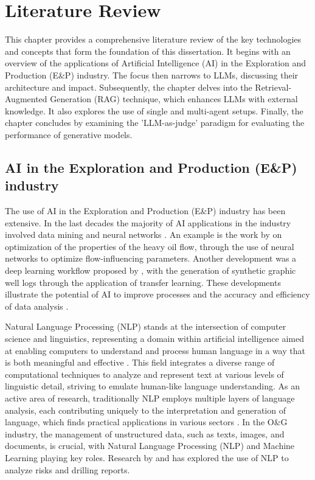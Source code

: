    
\chapter{Literature Review} 


    This chapter provides a comprehensive literature review of the key technologies and concepts that form the foundation of this dissertation. It begins with an overview of the applications of Artificial Intelligence (AI) in the Exploration and Production (E\&P) industry. The focus then narrows to LLMs, discussing their architecture and impact. Subsequently, the chapter delves into the Retrieval-Augmented Generation (RAG) technique, which enhances LLMs with external knowledge. It also explores the use of single and multi-agent setups. Finally, the chapter concludes by examining the 'LLM-as-judge' paradigm for evaluating the performance of generative models.


    \section{AI in the Exploration and Production (E\&P) industry}

        The use of AI in the Exploration and Production (E\&P) industry has been extensive. 
        In the last decades the majority of AI applications in the industry involved data mining and neural networks \citep{Bravo2014}. 
        An example is the work by \citep{Gudala2021} on optimization of the properties of the heavy oil flow, through the use of neural networks to optimize flow-influencing parameters.
        Another development was a deep learning workflow proposed by \citep{Gohari2024}, with the generation of synthetic graphic well logs through the application of transfer learning. 
        These developments illustrate the potential of AI to improve processes and the accuracy and efficiency of data analysis \citep{Rahmani2021}.
    
        Natural Language Processing (NLP) stands at the intersection of computer science and linguistics, representing a domain within artificial intelligence aimed at enabling computers to understand and process human language in a way that is both meaningful and effective \citep{Liddy2001}. 
        This field integrates a diverse range of computational techniques to analyze and represent text at various levels of linguistic detail, striving to emulate human-like language understanding. 
        As an active area of research, traditionally NLP employs multiple layers of language analysis, each contributing uniquely to the interpretation and generation of language, which finds practical applications in various sectors \citep{Liddy2001}.      
        In the O\&G industry, the management of unstructured data, such as texts, images, and documents, is crucial, with Natural Language Processing (NLP) and Machine Learning playing key roles.
        Research by \citet{Antoniak2016} and \citet{Castineira2018} has explored the use of NLP to analyze risks and drilling reports.           
    
